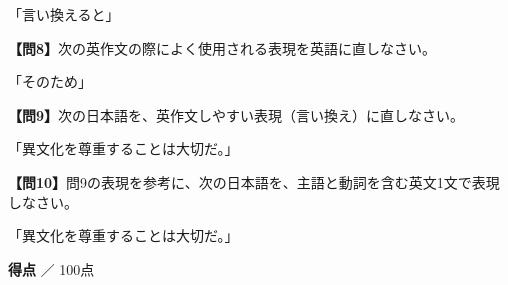 \noindent「言い換えると」

\vfill

\noindent\textbf{【問8】}次の英作文の際によく使用される表現を英語に直しなさい。

\noindent「そのため」

\vfill

\noindent\textbf{【問9】}次の日本語を、英作文しやすい表現（言い換え）に直しなさい。

\noindent「異文化を尊重することは大切だ。」

\vfill

\noindent\textbf{【問10】}問9の表現を参考に、次の日本語を、主語と動詞を含む英文1文で表現しなさい。

\noindent「異文化を尊重することは大切だ。」


\vfill
\begin{flushright}
\textbf{得点} \underline{\hspace{8em}} ／ 100点
\end{flushright}
